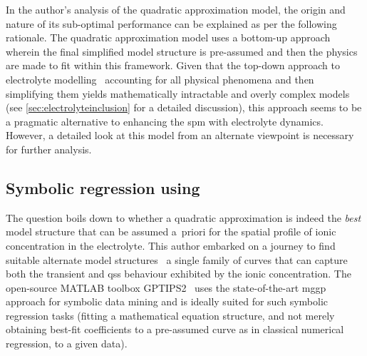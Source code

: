 

In the  author's analysis of the  quadratic approximation model, the  origin and
nature of  its sub-optimal  performance can  be explained  as per  the following
rationale. The quadratic  approximation model uses a  bottom-up approach wherein
the final  simplified model structure  is pre-assumed  and then the  physics are
made  to  fit  within  this  framework. Given  that  the  top-down  approach  to
electrolyte  modelling \ie~accounting for  all physical  phenomena and  then
simplifying  them yields  mathematically intractable  and overly  complex models
(see \cref{sec:electrolyteinclusion} for  a detailed discussion),  this approach
seems to be a pragmatic alternative  to enhancing the \gls{spm} with electrolyte
dynamics. However, a detailed look at  this model from an alternate viewpoint is
necessary for further analysis.


\subsection{Symbolic regression using }\label{subsec:symbolicreg}

The  question boils  down to  whether a  quadratic approximation  is indeed  the
\emph{best}  model structure  that  can  be assumed  a~priori  for the  spatial
profile  of  ionic  concentration  in  the  electrolyte.  This  author  embarked
on  a journey  to  find  suitable alternate  model  structures \ie~a  single
family of  curves that can  capture both  the transient and  \gls{qss} behaviour
exhibited by  the ionic  concentration. The open-source  \textsc{MATLAB} toolbox
GPTIPS2~\cite{Searson2015}  uses the  state-of-the-art  \gls{mggp} approach  for
symbolic data  mining and is ideally  suited for such symbolic  regression tasks
(fitting a  mathematical equation structure,  and not merely  obtaining best-fit
coefficients to a  pre-assumed curve as in classical numerical  regression, to a
given data).

